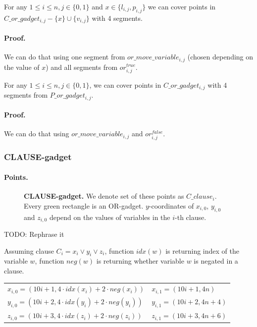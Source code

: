 \begin{lemma}
\label{cover_or_true}
For any $1 \le i \le n, j \in \{0, 1\}$ and 
 $x \in \{l_{i, j}, p_{i, j}\}$ we can cover points in
$C\_or\_gadget_{i, j} - \{ x\} \cup \{v_{i, j}\}$
with 4 segments.
\end{lemma}

\paragraph{Proof.}
We can do that using one segment from
$or\_move\_variable_{i, j}$
(chosen depending on the value of $x$)
and all segments from $or^{true}_{i, j}$.

\begin{lemma}
\label{cover_or_false}
For any $1 \le i \le n, j \in \{0, 1\}$, we can cover points in
$C\_or\_gadget_{i, j}$ with 4 segments from $P\_or\_gadget_{i,j}$.
\end{lemma}
\paragraph{Proof.}
We can do that using  $or\_move\_variable_{i, j}$
and $or^{false}_{i, j}$.


\subsubsection{CLAUSE-gadget}

\paragraph{Points.}


\begin{figure}[h]
\centering
\def\svgwidth{0.8\columnwidth}

\caption{\textbf{CLAUSE-gadget.}
We denote set of these points as $C\_clause_i$.
Every green rectangle is an OR-gadget.
$y$-coordinates of $x_{i, 0}$, $y_{i, 0}$ and $z_{i,0}$
depend on the values of variables in the $i$-th clause.
}
\label{fig:apx_clause}
\end{figure}

TODO: Rephrase it

Assuming clause $C_i = x_i \lor y_i \lor z_i$,
function $idx(w)$ is returning index of the variable $w$,
function $neg(w)$ is returning whether variable $w$ is negated
in a clause.

\begin{center}
\begin{tabular}{ l l }
	$x_{i, 0} = (10i+1, 4\cdot idx(x_i) + 2\cdot neg(x_i))$ &
	$x_{i, 1} = (10i+1, 4n)$ \\
	$y_{i, 0} = (10i+2, 4\cdot idx(y_i) + 2\cdot neg(y_i))$ &
	$y_{i, 1} = (10i+2, 4n + 4)$ \\
	$z_{i, 0} = (10i+3, 4\cdot idx(z_i) + 2\cdot neg(z_i))$ &
	$z_{i, 1} = (10i+3, 4n + 6)$
\end{tabular}
\end{center}
	
